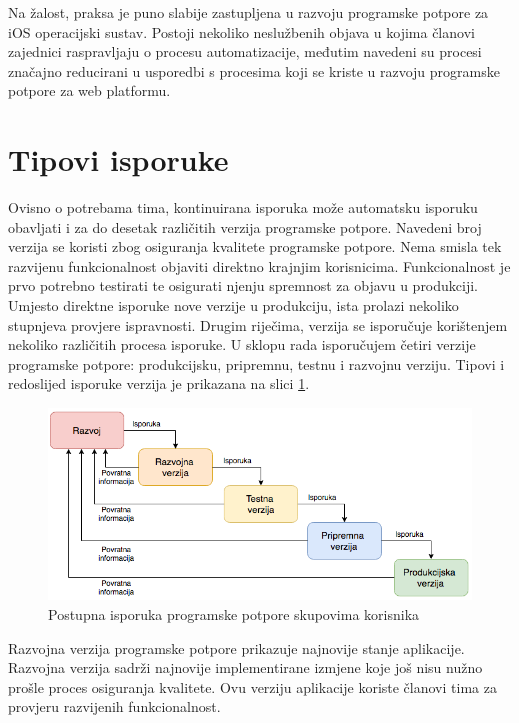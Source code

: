 \documentclass[times, utf8, diplomski, numeric]{fer}
\begin{document}
Na žalost, praksa je puno slabije zastupljena u razvoju programske potpore za iOS operacijski sustav. Postoji nekoliko neslužbenih objava u kojima članovi zajednici raspravljaju o procesu automatizacije, međutim navedeni su procesi značajno reducirani u usporedbi s procesima koji se kriste u razvoju programske potpore za web platformu.

\section{Tipovi isporuke}

Ovisno o potrebama tima, kontinuirana isporuka može automatsku isporuku obavljati i za do desetak različitih verzija programske potpore. Navedeni broj verzija se koristi zbog osiguranja kvalitete programske potpore. Nema smisla tek razvijenu funkcionalnost objaviti direktno krajnjim korisnicima. Funkcionalnost je prvo potrebno testirati te osigurati njenju spremnost za objavu u produkciji. Umjesto direktne isporuke nove verzije u produkciju, ista prolazi nekoliko stupnjeva provjere ispravnosti. Drugim riječima, verzija se isporučuje korištenjem nekoliko različitih procesa isporuke. U sklopu rada isporučujem četiri verzije programske potpore: produkcijsku, pripremnu, testnu i razvojnu verziju. Tipovi i redoslijed isporuke verzija je prikazana na slici \ref{fig:DeploymentStages}.

\begin{figure}[h]
\centering
\includegraphics[scale=0.6]{DeploymentStages}
\caption{Postupna isporuka programske potpore skupovima korisnika}
\label{fig:DeploymentStages}
\end{figure}

Razvojna verzija programske potpore prikazuje najnovije stanje aplikacije. Razvojna verzija sadrži najnovije implementirane izmjene koje još nisu nužno prošle proces osiguranja kvalitete. Ovu verziju aplikacije koriste članovi tima za provjeru razvijenih funkcionalnost.
\end{document}

